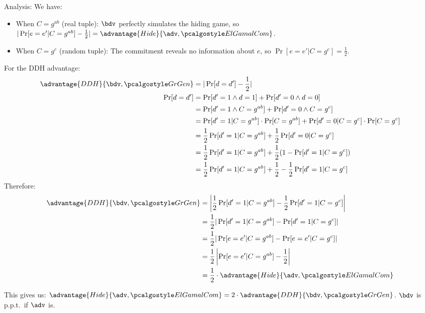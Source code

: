 \begin{enumerate}
        Analysis: We have:
        \begin{itemize}
            \item When $C = g^{ab}$ (real tuple): $\bdv$ perfectly simulates the hiding game, so $|\Pr[e = e' | C = g^{ab}] - \frac{1}{2}| = \advantage{Hide}{\adv, \algo{ElGamalCom}}$.
            \item When $C = g^c$ (random tuple): The commitment reveals no information about $e$, so $\Pr[e = e' | C = g^c] = \frac{1}{2}$.
        \end{itemize}
        For the DDH advantage:
        \begin{align}
        \advantage{DDH}{\bdv, \grgen} &= |\Pr[d = d'] - \frac{1}{2}|\\
        \Pr[d = d'] &= \Pr[d' = 1 \wedge d = 1] + \Pr[d' = 0 \wedge d = 0]\\
        &= \Pr[d' = 1 \wedge C = g^{ab}] + \Pr[d' = 0 \wedge C = g^c]\\
        &= \Pr[d' = 1 | C = g^{ab}] \cdot \Pr[C = g^{ab}] + \Pr[d' = 0 | C = g^c] \cdot \Pr[C = g^c]\\
        &= \frac{1}{2} \Pr[d' = 1 | C = g^{ab}] + \frac{1}{2} \Pr[d' = 0 | C = g^c]\\
        &= \frac{1}{2} \Pr[d' = 1 | C = g^{ab}] + \frac{1}{2}(1 - \Pr[d' = 1 | C = g^c])\\
        &= \frac{1}{2} \Pr[d' = 1 | C = g^{ab}] + \frac{1}{2} - \frac{1}{2}\Pr[d' = 1 | C = g^c]
        \end{align}
        Therefore:
        \begin{align}
        \advantage{DDH}{\bdv, \grgen} &= \left|\frac{1}{2} \Pr[d' = 1 | C = g^{ab}] - \frac{1}{2}\Pr[d' = 1 | C = g^c]\right|\\
        &= \frac{1}{2} |\Pr[d' = 1 | C = g^{ab}] - \Pr[d' = 1 | C = g^c]|\\
        &= \frac{1}{2} |\Pr[e = e' | C = g^{ab}] - \Pr[e = e' | C = g^c]|\\
        &= \frac{1}{2} \left|\Pr[e = e' | C = g^{ab}] - \frac{1}{2}\right|\\
        &= \frac{1}{2} \cdot \advantage{Hide}{\adv, \algo{ElGamalCom}}
        \end{align}

        This gives us: $\advantage{Hide}{\adv, \algo{ElGamalCom}} = 2 \cdot \advantage{DDH}{\bdv, \grgen}$. $\bdv$ is p.p.t.\ if $\adv$ is.


\end{enumerate}
